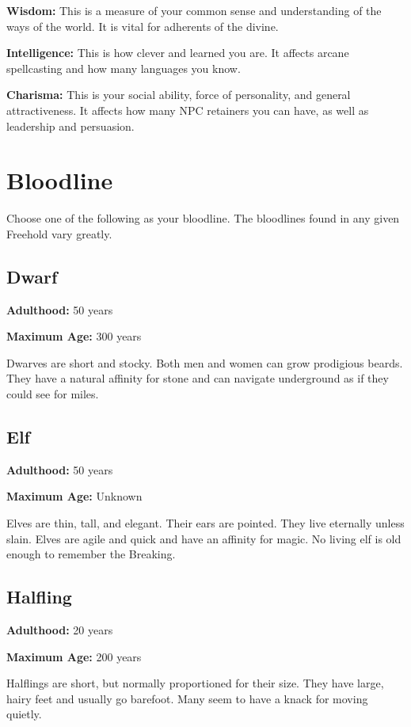 \begin{multicols}{2}
\textbf{Wisdom:} This is a measure of your common sense and understanding of the
ways of the world. It is vital for adherents of the divine.

\textbf{Intelligence:} This is how clever and learned you are. It affects arcane
spellcasting and how many languages you know.

\textbf{Charisma:} This is your social ability, force of personality, and general
attractiveness. It affects how many NPC retainers you can have, as well as
leadership and persuasion.

\section{Bloodline}

Choose one of the following as your bloodline. The bloodlines found in any given Freehold
vary greatly.

\subsection{Dwarf}

\textbf{Adulthood:} 50 years

\textbf{Maximum Age:} 300 years

Dwarves are short and stocky. Both men and women can grow prodigious beards.
They have a natural affinity for stone and can navigate underground as if they
could see for miles.

\subsection{Elf}

\textbf{Adulthood:} 50 years

\textbf{Maximum Age:} Unknown

Elves are thin, tall, and elegant. Their ears are pointed. They live eternally
unless slain. Elves are agile and quick and have an affinity for magic. No living
elf is old enough to remember the Breaking.

\subsection{Halfling}

\textbf{Adulthood:} 20 years

\textbf{Maximum Age:} 200 years

Halflings are short, but normally proportioned for their size. They have
large, hairy feet and usually go barefoot. Many seem to have a knack for
moving quietly.


\end{multicols}
